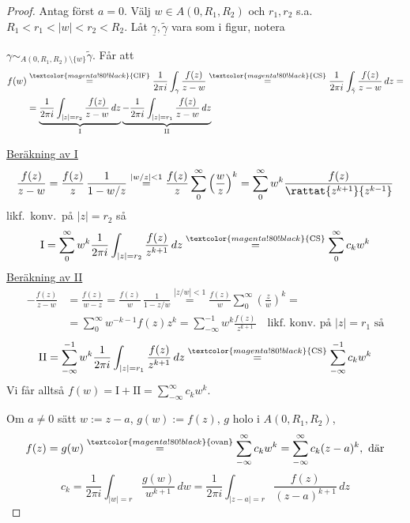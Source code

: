 \begin{proof}
Antag först $a = 0$.
Välj $w \in A(0, R_1, R_2)$ och $r_1, r_2$ s.a.\ $R_1 < r_1 < |w| < r_2 < R_2$.
Låt $\underline{\gamma}, \underline{\tilde{\gamma}}$ vara som i figur, notera


$\gamma \sim_{A(0, R_1, R_2) \setminus \{w\}} \tilde{\gamma}$. Får att
\begin{align*}
f(w) &\overset{\textcolor{magenta!80!black}{\text{CIF}}}{=} \frac{1}{2\pi i}\int_\gamma \frac{f(z)}{z - w} \overset{\textcolor{magenta!80!black}{\text{CS}}}{=} \frac{1}{2\pi i}\int_{\tilde{\gamma}} \frac{f(z)}{z - w}\,dz = \\
&= \underbrace{\frac{1}{2\pi i}\int_{|z| = r_2} \frac{f(z)}{z - w}\,dz}_{\text{I}} \underbrace{- \frac{1}{2\pi i}\int_{|z| = r_1} \frac{f(z)}{z - w}\,dz}_{\text{II}}
\end{align*}

\underline{Beräkning av I}
\[ \frac{f(z)}{z - w} = \frac{f(z)}{z}\,\frac{1}{1 - w/z} \overset{|w/z| < 1}{=} \frac{f(z)}{z}\sum_0^\infty \left( \frac{w}{z} \right)^k = \sum_0^\infty w^k \frac{f(z)}{\rattat{z^{k + 1}}{z^{k - 1}}} \]
likf.\ konv.\ på $|z| = r_2$ så
\[ \text{I} = \sum_0^\infty w^k \frac{1}{2\pi i}\int_{|z| = r_2} \frac{f(z)}{z^{k + 1}}\,dz \overset{\textcolor{magenta!80!black}{\text{CS}}}{=} \sum_0^\infty c_k w^k \]
\underline{Beräkning av II}
\begin{align*}
-\frac{f(z)}{z - w} &= \frac{f(z)}{w - z} = \frac{f(z)}{w}\,\frac{1}{1 - z/w} \overset{|z/w| < 1}{=} \frac{f(z)}{w}\sum_0^\infty \left( \frac{z}{w} \right)^k = \\
&= \sum_0^\infty w^{-k-1} f(z) z^k = \sum_{-\infty}^{-1} w^k \frac{f(z)}{z^{k + 1}} \quad \text{likf.\ konv.\ på } |z| = r_1 \text{ så}
\end{align*}
\[ \text{II} = \sum_{-\infty}^{-1} w^k \frac{1}{2\pi i}\int_{|z| = r_1} \frac{f(z)}{z^{k + 1}}\,dz \overset{\textcolor{magenta!80!black}{\text{CS}}}{=} \sum_{-\infty}^{-1} c_k w^k \]
Vi får alltså $f(w) = \text{I} + \text{II} = \displaystyle\sum_{-\infty}^\infty c_k w^k$.

Om $a \neq 0$ sätt $w := z - a$, $g(w) := f(z)$, $g$ holo i $A(0, R_1, R_2)$,
\[ f(z) = g(w) \overset{\textcolor{magenta!80!black}{\text{ovan}}}{=} \sum_{-\infty}^\infty c_k w^k = \sum_{-\infty}^\infty c_k(z - a)^k, \text{ där} \]
\[ c_k = \frac{1}{2\pi i}\int_{|w| = r} \frac{g(w)}{w^{k + 1}}\,dw = \frac{1}{2\pi i}\int_{|z - a| = r} \frac{f(z)}{(z - a)^{k + 1}}\,dz \]
\end{proof}
